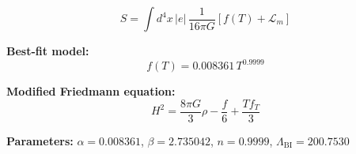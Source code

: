
\begin{equation}
  S = \int d^4x \, |e| \, \frac{1}{16\pi G} \left[ f(T) + \mathcal{L}_m \right]
\end{equation}

\textbf{Best-fit model:}
\begin{equation}
  f(T) = 0.008361 \, T^{0.9999}
\end{equation}

\textbf{Modified Friedmann equation:}
\begin{equation}
  H^2 = \frac{8\pi G}{3} \rho - \frac{f}{6} + \frac{T f_T}{3}
\end{equation}

\textbf{Parameters:}
$\alpha = 0.008361$, \quad
$\beta = 2.735042$, \quad
$n = 0.9999$, \quad
$\Lambda_{\text{BI}} = 200.7530$